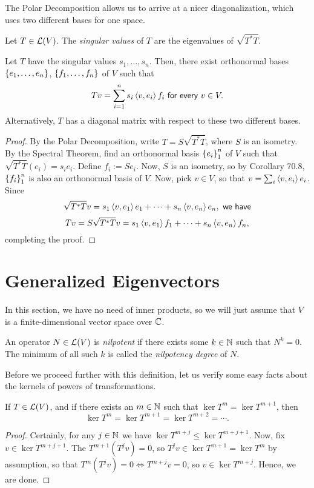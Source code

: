 \documentclass{article}
\begin{document}
The Polar Decomposition allows us to arrive at a nicer diagonalization, which uses two different bases for one space.
\begin{definition}
Let $T\in\mathcal L(V)$. The \textit{singular values} of $T$ are the eigenvalues of $\sqrt{T^*T}$.
\end{definition}
\begin{theorem}
Let $T$ have the singular values $s_1, \ldots, s_n$. Then, there exist orthonormal bases $\left\{e_1, \ldots, e_n\right\}$, $\left\{f_1, \ldots, f_n\right\}$ of $V$ such that
$$Tv = \sum_{i=1}^n s_i\left\langle v, e_i\right\rangle f_i \textsf{ for every } v\in V.$$
Alternatively, $T$ has a diagonal matrix with respect to these two different bases.
\end{theorem}
\begin{proof}
By the Polar Decomposition, write $T= S\sqrt{T^*T}$, where $S$ is an isometry. By the Spectral Theorem, find an orthonormal basis $\left\{e_i\right\}_1^n$ of $V$ such that $\sqrt{T^*T}(e_i) = s_ie_i$. Define $f_i := Se_i$. Now, $S$ is an isometry, so by Corollary 70.8, $\left\{f_i\right\}_1^n$ is also an orthonormal basis of $V$. Now, pick $v\in V$, so that $v = \sum_i \left\langle v, e_i\right\rangle e_i$. Since
$$\sqrt{T^*T}v= s_1\left\langle v, e_1\right\rangle e_1 + \cdots + s_n\left\langle v, e_n\right\rangle e_n, \textsf{ we have}$$
$$Tv = S\sqrt{T^*T}v = s_1\left\langle v, e_1\right\rangle f_1 + \cdots + s_n\left\langle v, e_n\right\rangle f_n,$$
completing the proof.
\end{proof}
\newpage
{}
\section{Generalized Eigenvectors}
In this section, we have no need of inner products, so we will just assume that $V$ is a finite-dimensional vector space over $\mathbb C$.
\begin{definition}
An operator $N\in\mathcal L(V)$ is \textit{nilpotent} if there exists some $k\in\mathbb N$ such that $N^k = 0$. The minimum of all such $k$ is called the \textit{nilpotency degree} of $N$.
\end{definition}

Before we proceed further with this definition, let us verify some easy facts about the kernels of powers of transformations.
\begin{lemma}
If $T\in\mathcal L(V)$, and if there exists an $m\in\mathbb N$ such that $\ker T^m = \ker T^{m+1}$, then
$$\ker T^m = \ker T^{m+1} = \ker T^{m+2} = \cdots.$$
\end{lemma}
\begin{proof}
Certainly, for any $j\in\mathbb N$ we have $\ker T^{m+j} \leq \ker T^{m+j+1}$. Now, fix $v\in \ker T^{m+j+1}$. The $T^{m+1}(T^jv) = 0$, so $T^jv \in \ker T^{m+1} = \ker T^m$ by assumption, so that $T^m(T^jv) = 0 \iff T^{m+j}v = 0$, so $v\in \ker T^{m+j}$. Hence, we are done.
\end{proof}
\end{document}
